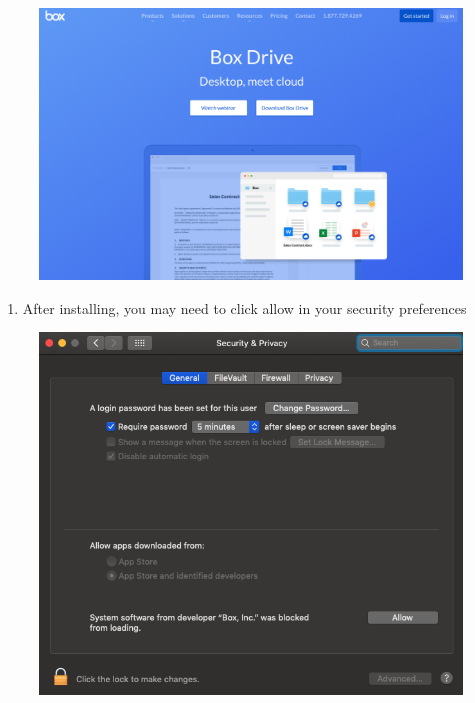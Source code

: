 \documentclass[]{book}
\providecommand{\tightlist}{%
  \setlength{\itemsep}{0pt}\setlength{\parskip}{0pt}}
\begin{document}
\begin{figure}
\centering
\includegraphics{images/lab_protocols/box/1.png}
\caption{}
\end{figure}

\begin{enumerate}
\def\labelenumi{\arabic{enumi}.}
\setcounter{enumi}{1}
\tightlist
\item
  After installing, you may need to click allow in your security
  preferences
\end{enumerate}

\begin{figure}
\centering
\includegraphics{images/lab_protocols/box/2.png}
\caption{}
\end{figure}
\end{document}
